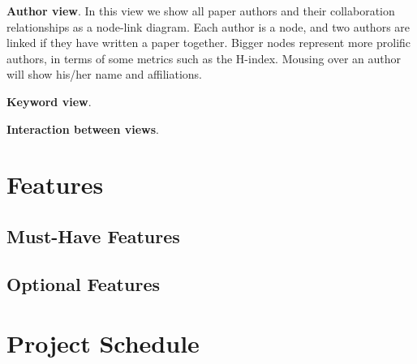 \documentclass[dvips,12pt]{article}
\begin{document}
\textbf{Author view}. In this view we show all paper authors and their collaboration relationships as a node-link diagram. Each author is a node, and two authors are linked if they have written a paper together. Bigger nodes represent more prolific authors, in terms of some metrics such as the H-index. Mousing over an author will show his/her name and affiliations.

\textbf{Keyword view}. 

\textbf{Interaction between views}.

\section{Features}
\subsection{Must-Have Features}
\subsection{Optional Features}

\section{Project Schedule}

\end{document}
